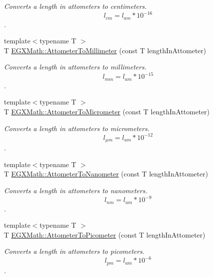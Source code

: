 \begin{DoxyCompactItemize}
\begin{DoxyCompactList}\small\item\em Converts a length in attometers to centimeters. \[ l_{cm}=l_{am} * 10^{-16} \]. \end{DoxyCompactList}\item 
{\footnotesize template$<$typename T $>$ }\\T \mbox{\hyperlink{group___e_g_x_math-_conversions-_length_conversions-_attometer-_s_i_gaa1844671e09a5d485145eb7cc152ba19}{E\+G\+X\+Math\+::\+Attometer\+To\+Millimeter}} (const T length\+In\+Attometer)
\begin{DoxyCompactList}\small\item\em Converts a length in attometers to millimeters. \[ l_{mm}=l_{am} * 10^{-15} \]. \end{DoxyCompactList}\item 
{\footnotesize template$<$typename T $>$ }\\T \mbox{\hyperlink{group___e_g_x_math-_conversions-_length_conversions-_attometer-_s_i_gaa98a14657ea865a6cac8fb8fc42172a2}{E\+G\+X\+Math\+::\+Attometer\+To\+Micrometer}} (const T length\+In\+Attometer)
\begin{DoxyCompactList}\small\item\em Converts a length in attometers to micrometers. \[ l_{\mu m}=l_{am} * 10^{-12} \]. \end{DoxyCompactList}\item 
{\footnotesize template$<$typename T $>$ }\\T \mbox{\hyperlink{group___e_g_x_math-_conversions-_length_conversions-_attometer-_s_i_gacb010bf3c4fb120c4a43cf16c7d9c77f}{E\+G\+X\+Math\+::\+Attometer\+To\+Nanometer}} (const T length\+In\+Attometer)
\begin{DoxyCompactList}\small\item\em Converts a length in attometers to nanometers. \[ l_{nm}=l_{am} * 10^{-9} \]. \end{DoxyCompactList}\item 
{\footnotesize template$<$typename T $>$ }\\T \mbox{\hyperlink{group___e_g_x_math-_conversions-_length_conversions-_attometer-_s_i_ga46ccf47b501bffeb16bc792377e55991}{E\+G\+X\+Math\+::\+Attometer\+To\+Picometer}} (const T length\+In\+Attometer)
\begin{DoxyCompactList}\small\item\em Converts a length in attometers to picometers. \[ l_{pm}=l_{am} * 10^{-6} \]. \end{DoxyCompactList}\item 

\end{DoxyCompactItemize}
